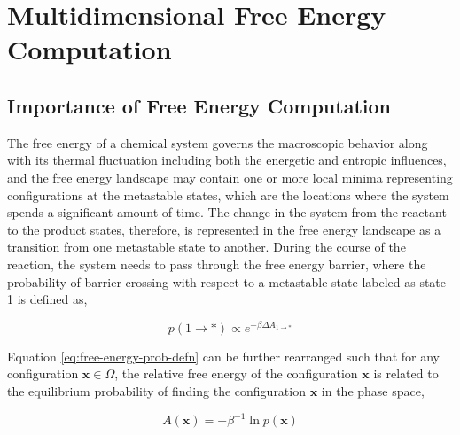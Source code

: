 \chapter{Multidimensional Free Energy Computation}

\section{Importance of Free Energy Computation}

\begin{spacing}{2.0}
    The free energy of a chemical system governs the macroscopic behavior along with its thermal fluctuation including both the energetic and 
    entropic influences, and the free energy landscape may contain one or more local minima representing configurations at the metastable states, 
    which are the locations where the system spends a significant amount of time. The change in the system from the reactant to the product states, 
    therefore, is represented in the free energy landscape as a transition from one metastable state to another. During the course of the reaction, 
    the system needs to pass through the free energy barrier, where the probability of barrier crossing with respect to a metastable state labeled as 
    state 1 is defined as,

    \begin{equation}
        p(1\to *) \propto e^{-\beta\Delta A_{1\to *}}
        \label{eq:free-energy-prob-defn}
    \end{equation}

    Equation \ref{eq:free-energy-prob-defn} can be further rearranged such that for any configuration $\mathbf{x} \in \Omega$,  the relative free 
    energy of the configuration $\mathbf{x}$ is related to the equilibrium probability of finding the configuration $\mathbf{x}$ in the phase space,

    \begin{equation}
        A(\mathbf{x}) = -\beta^{-1}\ln p(\mathbf{x})
    \end{equation}


\end{spacing}
